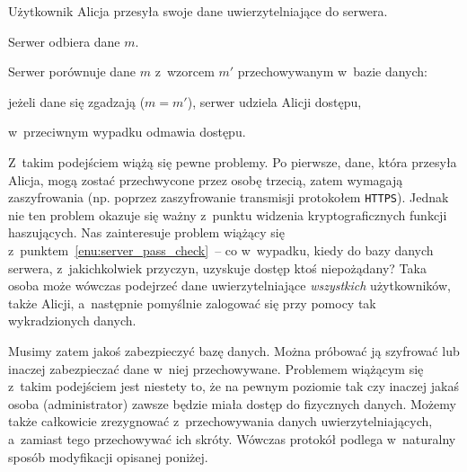 \begin{myenumerate}

    \item Użytkownik Alicja przesyła swoje dane uwierzytelniające do serwera.

    \item Serwer odbiera dane $m$.

    \item Serwer porównuje dane $m$ z~wzorcem $m'$ przechowywanym w~bazie
    danych: \label{enu:server_pass_check}

    \begin{myenumerate}

        \item jeżeli dane się zgadzają ($m = m'$), serwer udziela Alicji
        dostępu,

        \item w~przeciwnym wypadku odmawia dostępu.

    \end{myenumerate}

\end{myenumerate}

Z~takim podejściem wiążą się pewne problemy. Po pierwsze, dane, która przesyła
Alicja, mogą zostać przechwycone przez osobę trzecią, zatem wymagają
zaszyfrowania (np. poprzez zaszyfrowanie transmisji protokołem \texttt{HTTPS}).
Jednak nie ten problem okazuje się ważny z~punktu widzenia kryptograficznych
funkcji haszujących. Nas zainteresuje problem wiążący się
z~punktem~\ref{enu:server_pass_check}~-- co w~wypadku, kiedy do bazy danych
serwera, z~jakichkolwiek przyczyn, uzyskuje dostęp ktoś niepożądany? Taka osoba
może wówczas podejrzeć dane uwierzytelniające \emph{wszystkich} użytkowników,
także Alicji, a~następnie pomyślnie zalogować się przy pomocy tak wykradzionych
danych.

Musimy zatem jakoś zabezpieczyć bazę danych. Można próbować ją szyfrować lub
inaczej zabezpieczać dane w~niej przechowywane. Problemem wiążącym się z~takim
podejściem jest niestety to, że na pewnym poziomie tak czy inaczej jakaś osoba
(administrator) zawsze będzie miała dostęp do fizycznych danych. Możemy także
całkowicie zrezygnować z~przechowywania danych uwierzytelniających, a~zamiast
tego przechowywać ich skróty. Wówczas protokół podlega w~naturalny sposób
modyfikacji opisanej poniżej.

